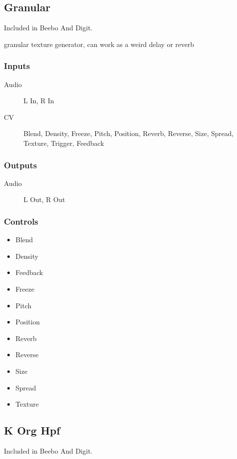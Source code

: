 \subsection{Granular}

Included in Beebo And Digit.

granular texture generator, can work as a weird delay or reverb



\subsubsection{Inputs}
\begin{description}
\item [Audio] L In, R In
\item [CV] Blend, Density, Freeze, Pitch, Position, Reverb, Reverse, Size, Spread, Texture, Trigger, Feedback
\end{description}

\subsubsection{Outputs}
\begin{description}
\item [Audio] L Out, R Out
\end{description}

\subsubsection{Controls}
\begin{itemize}
\item Blend
\item Density
\item Feedback
\item Freeze
\item Pitch
\item Position
\item Reverb
\item Reverse
\item Size
\item Spread
\item Texture
\end{itemize}

\subsection{K Org Hpf}

Included in Beebo And Digit.

